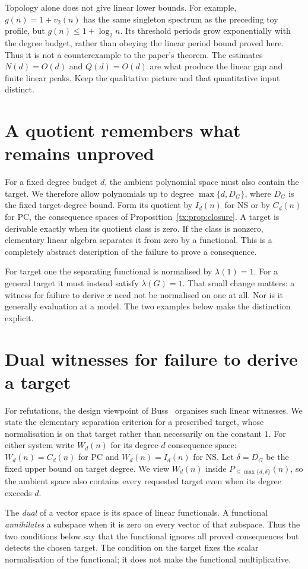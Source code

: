 Topology alone does not give linear lower bounds. For example,
$g(n)=1+v_2(n)$ has the same singleton spectrum as the preceding toy
profile, but $g(n)\le1+\log_2 n$. Its threshold periods grow
exponentially with the degree budget, rather than obeying the linear
period bound proved here. Thus it is not a counterexample to the
paper's theorem. The estimates $N(d)=O(d)$ and $Q(d)=O(d)$ are what
produce the linear gap and finite linear peaks. Keep the qualitative
picture and that quantitative input distinct.

\section{A quotient remembers what remains unproved}
For a fixed degree budget $d$, the ambient polynomial space must also
contain the target. We therefore allow polynomials up to degree
$\max\{d,D_G\}$, where $D_G$ is the fixed target-degree bound.
Form its quotient by $I_d(n)$ for NS or by $C_d(n)$ for PC, the consequence spaces
of Proposition~\ref{tx:prop:closure}. A target is derivable exactly when
its quotient class is zero. If the class is nonzero, elementary linear
algebra separates it from zero by a functional. This is a completely
abstract description of the failure to prove a consequence.

For target one the separating functional is normalised by $\lambda(1)=1$.
For a general target it must instead satisfy $\lambda(G)=1$.
That small change matters: a witness for failure to derive $x$ need not
be normalised on one at all. Nor is it generally evaluation at a model.
The two examples below make the distinction explicit.

\section{Dual witnesses for failure to derive a target}
For refutations, the design viewpoint of Buss~\cite{BussDesign}
organises such linear witnesses. We state the elementary separation
criterion for a prescribed target, whose normalisation is on that
target rather than necessarily on the constant $1$.
For either system write $W_d(n)$ for its degree-$d$ consequence space:
$W_d(n)=C_d(n)$ for PC and $W_d(n)=I_d(n)$ for NS. Let
$\delta=D_G$ be the fixed upper bound on target degree. We view
$W_d(n)$ inside $P_{\le\max\{d,\delta\}}(n)$, so the ambient space
also contains every requested target even when its degree exceeds $d$.

The \emph{dual} of a vector space is its space of linear functionals.
A functional \emph{annihilates} a subspace when it is zero on every
vector of that subspace. Thus the two conditions below say that the
functional ignores all proved consequences but detects the chosen
target. The condition on the target fixes the scalar normalisation of the
functional; it does not make the functional multiplicative.

